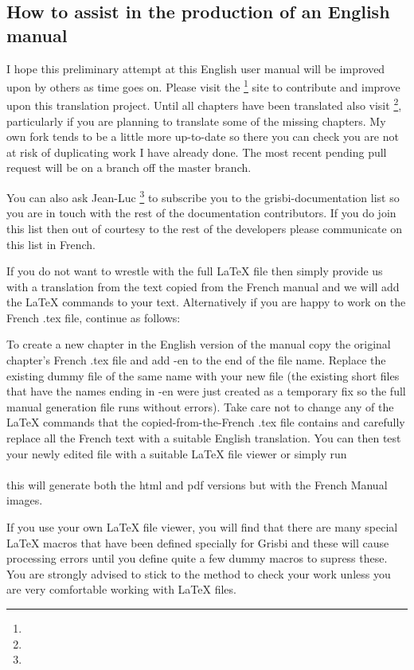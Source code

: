 \subsection*{How to assist in the production of an English manual}

I hope this preliminary attempt at this English user manual will be improved upon by others as time goes on. Please visit the \footnote{\urlGitDoc{}} site to contribute and improve upon this translation project. Until all chapters have been translated also visit  \footnote{\urlBobDoc{}}, particularly if you are planning to translate some of the missing chapters.  My own fork tends to be a little more up-to-date so there you can check you are not at risk of duplicating work I have already done.  The most recent pending pull request will be on a branch off the master branch.

You can also ask {Jean-Luc }\footnote{\urlJeanLucDuflotEmail{}} to subscribe you to the grisbi-documentation list so you are in touch with the rest of the documentation contributors. If you do join this list then out of courtesy to the rest of the developers please communicate on this list in French.  

If you do not want to wrestle with the full \LaTeX{} file then simply provide us with a translation from the text copied from the French manual and we will add the  \LaTeX{} commands to your text. Alternatively if you are happy to work on the French .tex file, continue as follows:

To create a new chapter in the English version of the manual copy the original chapter's French .tex file and add -en to the end of the file name.  Replace the existing dummy file of the same name with your new file (the existing short files that have the names ending in -en were just created as a temporary fix so the full manual generation  file runs without errors).  Take care not to change any of the \LaTeX{} commands that the copied-from-the-French .tex file contains and carefully replace all the French text with a suitable English translation.  You can then test your newly edited file with a suitable \LaTeX{} file viewer or simply run 
\\
\\this will generate both the html and pdf versions but with the French Manual images.

 If you use your own \LaTeX{} file viewer, you will find that there are many special \LaTeX{} macros that have been defined specially for Grisbi and these will cause processing errors until you define quite a few dummy macros to supress these. You are strongly advised to stick to the  method to check your work unless you are very comfortable working with \LaTeX{} files.

